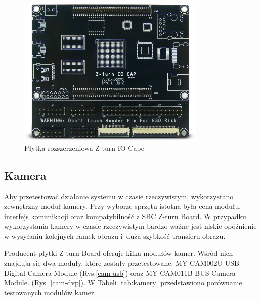 \begin{figure}[h]
  \centering
  \includegraphics[width=0.8\textwidth]{img/iocape.png}
  \caption{Płytka rozszerzeniowa Z-turn IO Cape \cite{iocape-obraz}}
  \label{iocape}
\end{figure}

\subsection{Kamera}

Aby przetestować działanie systemu w czasie rzeczywistym, wykorzystano zewnętrzny 
moduł kamery. Przy wyborze sprzętu istotna była ceną modułu, interfejs komunikacji
oraz kompatybilność z SBC Z-turn Board. W przypadku wykorzystania kamery w czasie 
rzeczywistym bardzo ważne jest niskie opóźnienie w wysyłaniu kolejnych ramek obrazu i~duża szybkość transferu obrazu. 

Producent płytki Z-turn Board oferuje kilka modułów kamer. Wśród nich znajdują się dwa moduły, które zostały przetestowane: 
MY-CAM002U USB Digital Camera Module (Rys.\ref{cam-usb}) oraz MY-CAM011B BUS Camera Module. (Rys. \ref{cam-dvp}). W Tabeli 
\ref{tab:kamery} przedstawiono porównanie testowanych modułów kamer. 

